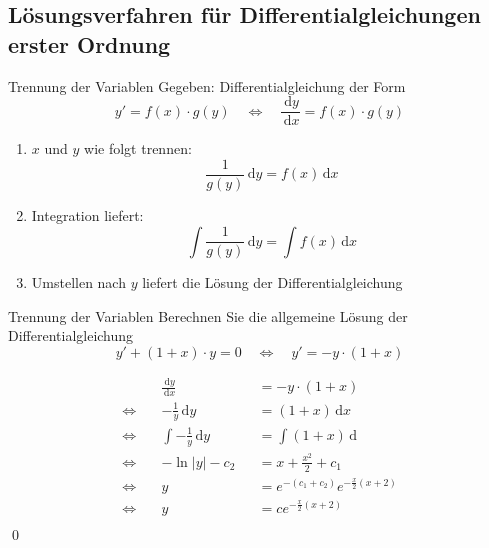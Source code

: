 \documentclass[german]{../spicker}
\renewcommand{\d}{\,\mathrm{d}}
\renewcommand{\abs}[1]{\left| #1 \right|}
\begin{document}
\subsection{Lösungsverfahren für Differentialgleichungen erster Ordnung}

\begin{algo}{Trennung der Variablen}
    Gegeben: Differentialgleichung der Form
    $$
        \boxed{y' = f(x) \cdot g(y)} \quad \iff \quad \frac{\d y}{\d x} = f(x) \cdot g(y)
    $$
    \begin{enumerate}
        \item $x$ und $y$ wie folgt trennen:
              $$
                  \frac{1}{g(y)} \d y = f(x) \d x
              $$
        \item Integration liefert:
              $$
                  \int \frac{1}{g(y)} \d y = \int f(x) \d x
              $$
        \item Umstellen nach $y$ liefert die Lösung der Differentialgleichung
    \end{enumerate}
\end{algo}

\begin{example}{Trennung der Variablen}
    Berechnen Sie die allgemeine Lösung der Differentialgleichung
    $$
        y' + (1+x)\cdot y = 0\quad \iff \quad y' = -y\cdot (1+x)
    $$
    \exampleseparator

    $$
        \begin{aligned}
                       & \frac{\d y}{\d x}      &  & = -y \cdot (1+x)                        \\
            \iff \quad & -\frac{1}{y} \d y      &  & = (1+x) \d x                            \\
            \iff \quad & \int -\frac{1}{y} \d y &  & = \int (1+x) \d                         \\
            \iff \quad & - \ln\abs{y} - c_2     &  & = x + \frac{x^2}{2} + c_1               \\
            \iff \quad & y                      &  & = e^{-(c_1 + c_2)}e^{-\frac{x}{2}(x+2)} \\
            \iff \quad & y                      &  & = ce^{-\frac{x}{2}(x+2)}                \\
        \end{aligned}
    $$\qed
\end{example}
\end{document}
